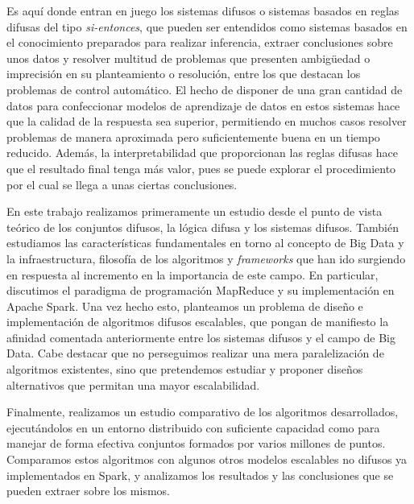 Es aquí donde entran en juego los sistemas difusos o sistemas basados en reglas difusas del tipo \textit{si-entonces}, que pueden ser entendidos como sistemas basados en el conocimiento preparados para realizar inferencia, extraer conclusiones sobre unos datos y resolver multitud de problemas que presenten ambigüedad o imprecisión en su planteamiento o resolución, entre los que destacan los problemas de control automático. El hecho de disponer de una gran cantidad de datos para confeccionar modelos de aprendizaje de datos en estos sistemas hace que la calidad de la respuesta sea superior, permitiendo en muchos casos resolver problemas de manera aproximada pero suficientemente buena en un tiempo reducido. Además, la interpretabilidad que proporcionan las reglas difusas hace que el resultado final tenga más valor, pues se puede explorar el procedimiento por el cual se llega a unas ciertas conclusiones.

En este trabajo realizamos primeramente un estudio desde el punto de vista teórico de los conjuntos difusos, la lógica difusa y los sistemas difusos. También estudiamos las características fundamentales en torno al concepto de Big Data y la infraestructura, filosofía de los algoritmos y \textit{frameworks} que han ido surgiendo en respuesta al incremento en la importancia de este campo. En particular, discutimos el paradigma de programación MapReduce y su implementación en Apache Spark. Una vez hecho esto, planteamos un problema de diseño e implementación de algoritmos difusos escalables, que pongan de manifiesto la afinidad comentada anteriormente entre los sistemas difusos y el campo de Big Data. Cabe destacar que no perseguimos realizar una mera paralelización de algoritmos existentes, sino que pretendemos estudiar y proponer diseños alternativos que permitan una mayor escalabilidad.

Finalmente, realizamos un estudio comparativo de los algoritmos desarrollados, ejecutándolos en un entorno distribuido con suficiente capacidad como para manejar de forma efectiva conjuntos formados por varios millones de puntos. Comparamos estos algoritmos con algunos otros modelos escalables no difusos ya implementados en Spark, y analizamos los resultados y las conclusiones que se pueden extraer sobre los mismos.



